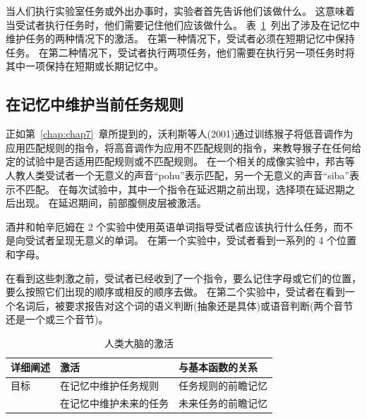 当人们执行实验室任务或外出办事时，实验者首先告诉他们该做什么。
这意味着当受试者执行任务时，他们需要记住他们应该做什么。
表~\ref{tab:9_3}~列出了涉及在记忆中维护任务的两种情况下的激活。
在第一种情况下，受试者必须在短期记忆中保持任务。
在第二种情况下，受试者执行两项任务，他们需要在执行另一项任务时将其中一项保持在短期或长期记忆中。



\subsection{在记忆中维护当前任务规则}
\par

正如第~\ref{chap:chap7}~章所提到的，沃利斯等人(2001)通过训练猴子将低音调作为应用匹配规则的指令，将高音调作为应用不匹配规则的指令，来教导猴子在任何给定的试验中是否适用匹配规则或不匹配规则。
在一个相关的成像实验中，邦吉等人\cite{bunge2003neural}教人类受试者一个无意义的声音“pohu”表示匹配，另一个无意义的声音“siba”表示不匹配。
在每次试验中，其中一个指令在延迟期之前出现，选择项在延迟期之后出现。
在延迟期间，前部腹侧皮层被激活。
\par


酒井和帕辛厄姆\cite{sakai2003prefrontal,sakai2006prefrontal}在 2 个实验中使用英语单词指导受试者应该执行什么任务，而不是向受试者呈现无意义的单词。
在第一个实验中，受试者看到一系列的 4 个位置和字母。
\par


在看到这些刺激之前，受试者已经收到了一个指令，要么记住字母或它们的位置，要么按照它们出现的顺序或相反的顺序去做\cite{sakai2003prefrontal}。
在第二个实验中，受试者在看到一个名词后，被要求报告对这个词的语义判断(抽象还是具体)或语音判断(两个音节还是一个或三个音节)。


\begin{table}[htbp] 
	\newcommand{\tabincell}[2]{\begin{tabular}{@{}#1@{}}#2\end{tabular}} %
	\centering
	\caption{人类大脑的激活\label{tab:9_3}}
	\renewcommand\arraystretch{1.5}	%
	\begin{tabular}{lll}
		\toprule
		详细阐述 & 激活 & 与基本函数的关系\\
		\midrule
		目标 & 在记忆中维护任务规则 & 任务规则的前瞻记忆  \\
		& 在记忆中维护未来的任务 & 未来任务的前瞻记忆 \\
		\bottomrule
		
	\end{tabular}%
\end{table}%
\par


